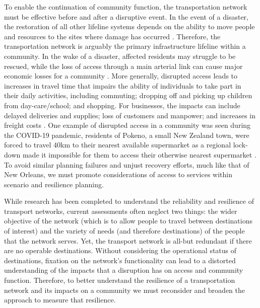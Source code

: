 \documentclass[review,3p,times,onecolumn,sort&compress,12pt]{elsarticle}
\let \cite \parencite
\begin{document}
To enable the continuation of community function, the transportation network must be effective before and after a disruptive event.
In the event of a disaster, the restoration of all other lifeline systems depends on the ability to move people and resources to the sites where damage has occurred \cite{Hopkins1991-ok}.
Therefore, the transportation network is arguably the primary infrastructure lifeline within a community.
In the wake of a disaster, affected residents may struggle to be rescued, while the loss of access through a main arterial link can cause major economic losses for a community \cite{Dalziell2001-un}.
More generally, disrupted access leads to increases in travel time that impairs the ability of individuals to take part in their daily activities, including commuting; dropping off and picking up children from day-care/school; and shopping.
For businesses, the impacts can include delayed deliveries and supplies; loss of customers and manpower; and increases in freight costs \cite{Jenelius2012-vp}.
One example of disrupted access in a community was seen during the COVID-19 pandemic, residents of Pokeno, a small New Zealand town, were forced to travel 40km to their nearest available supermarket as a regional lock-down made it impossible for them to access their otherwise nearest supermarket \cite{Preston2020-fc}.
To avoid similar planning failures and unjust recovery efforts, much like that of New Orleans, we must promote considerations of access to services within scenario and resilience planning.

While research has been completed to understand the reliability and resilience of transport networks, current assessments often neglect two things: the wider objective of the network (which is to allow people to travel between destinations of interest) and the variety of needs (and therefore destinations) of the people that the network serves.
Yet, the transport network is all-but redundant if there are no operable destinations.
Without considering the operational status of destinations, fixation on the network's functionality can lead to a distorted understanding of the impacts that a disruption has on access and community function.
Therefore, to better understand the resilience of a transportation network and its impacts on a community we must reconsider and broaden the approach to measure that resilience.
\end{document}
